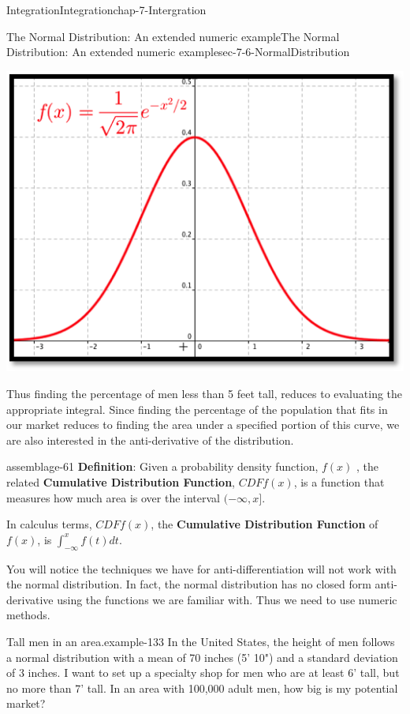 \documentclass[oneside,10pt,]{book}
\newcommand{\terminology}[1]{\textbf{#1}}
\numberwithin{equation}{section}
\begin{document}
\begin{chapterptx}{Integration}{}{Integration}{}{}{chap-7-Intergration}
\begin{sectionptx}{The Normal Distribution: An extended numeric example}{}{The Normal Distribution: An extended numeric example}{}{}{sec-7-6-NormalDistribution}
\begin{sidebyside}{1}{0.25}{0.25}{0}
\begin{sbspanel}{0.5}
\includegraphics[width=1\linewidth]{images/sec7-6-1.png}
\end{sbspanel}%
\end{sidebyside}%
\par
\hypertarget{p-2935}{}%
Thus finding the percentage of men less than 5 feet tall, reduces to evaluating the appropriate integral.  Since finding the percentage of the population that fits in our market reduces to finding the area under a specified portion of this curve, we are also interested in the anti-derivative of the distribution.%
\begin{assemblage}{}{assemblage-61}%
\hypertarget{p-2936}{}%
\terminology{Definition}: Given a probability density function, \(f(x)\) , the related \terminology{Cumulative Distribution Function},  \(CDFf(x)\), is a function that measures how much area is over the interval  \((-\infty,x]\).%
\par
\hypertarget{p-2937}{}%
In calculus terms,  \(CDFf(x)\), the \terminology{Cumulative Distribution Function} of  \(f(x)\), is  \(\int_{-\infty}^x f(t)dt\).%
\end{assemblage}
\hypertarget{p-2938}{}%
You will notice the techniques we have for anti-differentiation will not work with the normal distribution.  In fact, the normal distribution has no closed form anti-derivative using the functions we are familiar with.  Thus we need to use numeric methods.%
\begin{example}{Tall men in an area.}{example-133}%
\hypertarget{p-2939}{}%
In the United States, the height of men follows a normal distribution with a mean of 70 inches (5' 10") and a standard deviation of 3 inches.  I want to set up a specialty shop for men who are at least 6’ tall, but no more than 7' tall.  In an area with 100,000 adult men, how big is my potential market?%

\end{example}
\end{sectionptx}
\end{chapterptx}
\end{document}
